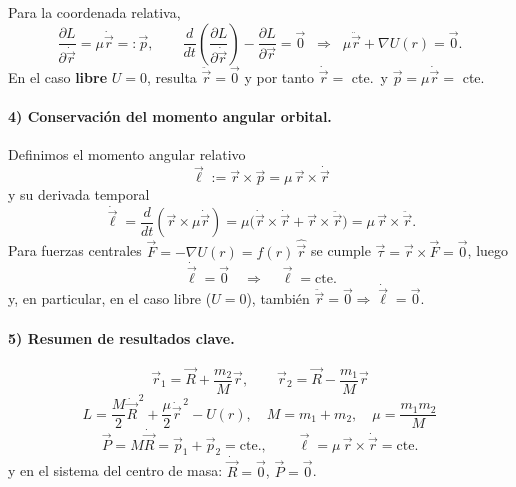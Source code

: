 Para la coordenada relativa,
\[
\frac{\partial L}{\partial\dot{\vec{r}}}=\mu\dot{\vec{r}}=: \vec{p},
\qquad
\frac{d}{dt}\!\left(\frac{\partial L}{\partial\dot{\vec{r}}}\right)
-\frac{\partial L}{\partial\vec{r}}=\vec{0}
\;\;\Rightarrow\;\;
\mu\ddot{\vec{r}}+\nabla U(r)=\vec{0}.
\]
En el caso \textbf{libre} $U=0$, resulta \(\ddot{\vec{r}}=\vec{0}\) y por tanto
\(\dot{\vec{r}}=\) cte.\ y \(\vec{p}=\mu\dot{\vec{r}}=\) cte.

\paragraph{4) Conservación del momento angular orbital.}
Definimos el momento angular relativo
\[
\boxed{\;\vec{\ell}:=\vec{r}\times\vec{p}=\mu\,\vec{r}\times\dot{\vec{r}}\;}
\]
y su derivada temporal
\[
\dot{\vec{\ell}}
=\frac{d}{dt}\!\left(\vec{r}\times\mu\dot{\vec{r}}\right)
=\mu\big(\dot{\vec{r}}\times\dot{\vec{r}}+\vec{r}\times\ddot{\vec{r}}\big)
=\mu\,\vec{r}\times\ddot{\vec{r}}.
\]
Para fuerzas centrales \(\vec{F}=-\nabla U(r)=f(r)\,\hat{\vec{r}}\) se cumple
\(\vec{\tau}=\vec{r}\times\vec{F}=\vec{0}\), luego
\[
\boxed{\;\dot{\vec{\ell}}=\vec{0}\quad\Rightarrow\quad \vec{\ell}=\text{cte.}\;}
\]
y, en particular, en el caso libre (\(U=0\)), también \(\ddot{\vec{r}}=\vec{0}\Rightarrow\dot{\vec{\ell}}=\vec{0}\).

\paragraph{5) Resumen de resultados clave.}
\[
\boxed{\;\vec{r}_1=\vec{R}+\frac{m_2}{M}\vec{r},\qquad
       \vec{r}_2=\vec{R}-\frac{m_1}{M}\vec{r}\;}
\]
\[
\boxed{\;L=\frac{M}{2}\dot{\vec{R}}^{\,2}+\frac{\mu}{2}\dot{\vec{r}}^{\,2}-U(r),\quad
       M=m_1+m_2,\quad \mu=\frac{m_1m_2}{M}\;}
\]
\[
\boxed{\;\vec{P}=M\dot{\vec{R}}=\vec{p}_1+\vec{p}_2=\text{cte.},\qquad
       \vec{\ell}=\mu\,\vec{r}\times\dot{\vec{r}}=\text{cte.}\;}
\]
y en el sistema del centro de masa: \(\dot{\vec{R}}=\vec{0}\), \(\vec{P}=\vec{0}\).
